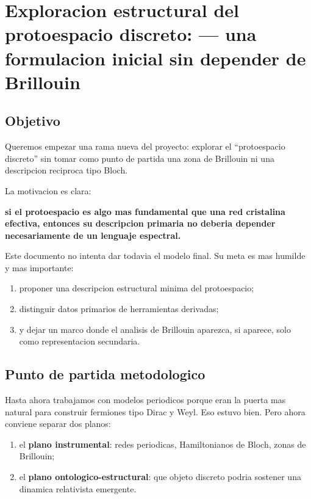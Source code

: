 \chapter{Exploracion estructural del protoespacio discreto: --- una formulacion inicial sin depender de Brillouin}
\label{ch:exploracion-estructural-protoespacio}







\section{Objetivo}
Queremos empezar una rama nueva del proyecto: explorar el \enquote{protoespacio discreto} sin tomar como punto de partida una zona de Brillouin ni una descripcion reciproca tipo Bloch.

La motivacion es clara:
\begin{displayquote}
\textbf{si el protoespacio es algo mas fundamental que una red cristalina efectiva, entonces su descripcion primaria no deberia depender necesariamente de un lenguaje espectral.}
\end{displayquote}

Este documento no intenta dar todavia el modelo final. Su meta es mas humilde y mas importante:
\begin{enumerate}[label=\arabic*.]
    \item proponer una descripcion estructural minima del protoespacio;
    \item distinguir datos primarios de herramientas derivadas;
    \item y dejar un marco donde el analisis de Brillouin aparezca, si aparece, solo como representacion secundaria.
\end{enumerate}

\section{Punto de partida metodologico}
Hasta ahora trabajamos con modelos periodicos porque eran la puerta mas natural para construir fermiones tipo Dirac y Weyl. Eso estuvo bien. Pero ahora conviene separar dos planos:
\begin{enumerate}[label=\arabic*.]
    \item el \textbf{plano instrumental}: redes periodicas, Hamiltonianos de Bloch, zonas de Brillouin;
    \item el \textbf{plano ontologico-estructural}: que objeto discreto podria sostener una dinamica relativista emergente.
\end{enumerate}

